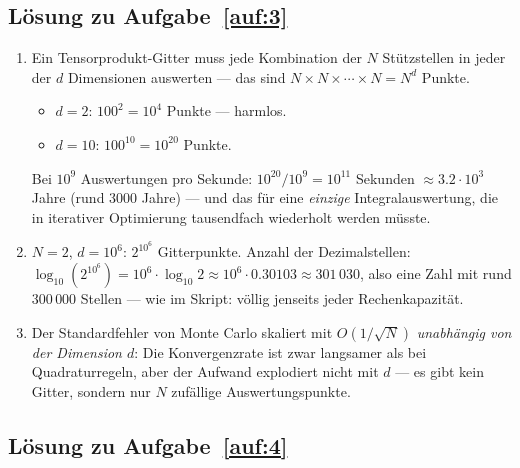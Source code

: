 \documentclass[a4paper,11pt]{scrartcl}
\begin{document}
\subsection*{Lösung zu Aufgabe~\ref{auf:3}}

\begin{enumerate}[label=(\alph*)]
  \item Ein Tensorprodukt-Gitter muss jede Kombination der $N$ Stützstellen in jeder der $d$ Dimensionen auswerten --- das sind $N \times N \times \cdots \times N = N^d$ Punkte.
  \begin{itemize}[nosep]
    \item $d = 2$: $100^2 = 10^4$ Punkte --- harmlos.
    \item $d = 10$: $100^{10} = 10^{20}$ Punkte.
  \end{itemize}
  Bei $10^9$ Auswertungen pro Sekunde: $10^{20}/10^9 = 10^{11}$ Sekunden $\approx 3{.}2 \cdot 10^3$ Jahre (rund 3000 Jahre) --- und das für eine \emph{einzige} Integralauswertung, die in iterativer Optimierung tausendfach wiederholt werden müsste.
  \item $N = 2$, $d = 10^6$: $2^{10^6}$ Gitterpunkte. Anzahl der Dezimalstellen: $\log_{10}\!\left(2^{10^6}\right) = 10^6 \cdot \log_{10} 2 \approx 10^6 \cdot 0.30103 \approx 301\,030$, also eine Zahl mit rund $300\,000$ Stellen --- wie im Skript: völlig jenseits jeder Rechenkapazität.
  \item Der Standardfehler von Monte Carlo skaliert mit $O(1/\sqrt{N})$ \emph{unabhängig von der Dimension $d$}: Die Konvergenzrate ist zwar langsamer als bei Quadraturregeln, aber der Aufwand explodiert nicht mit $d$ --- es gibt kein Gitter, sondern nur $N$ zufällige Auswertungspunkte.
\end{enumerate}

\subsection*{Lösung zu Aufgabe~\ref{auf:4}}
\end{document}
